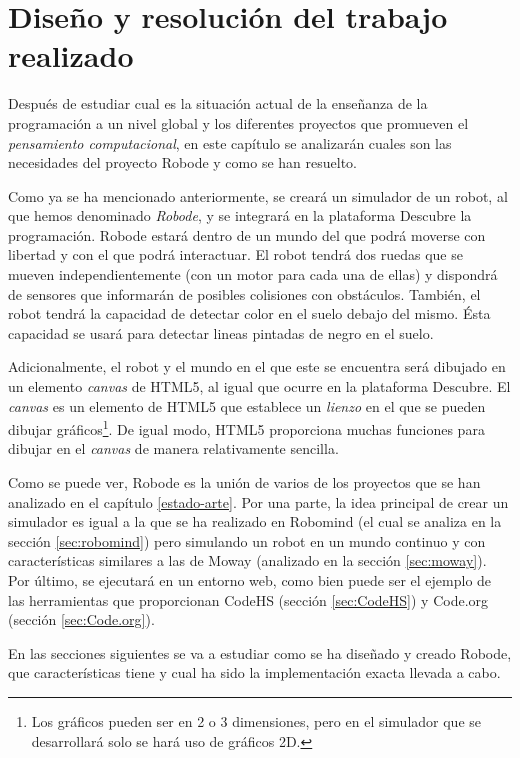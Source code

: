 \chapter{Diseño y resolución del trabajo realizado}
\label{diseno}

Después de estudiar cual es la situación actual de la enseñanza de la programación a un nivel global y los diferentes proyectos que promueven el \emph{pensamiento computacional}, en este capítulo se analizarán cuales son las necesidades del proyecto Robode y como se han resuelto.

Como ya se ha mencionado anteriormente, se creará un simulador de un robot, al que hemos denominado \emph{Robode}, y se integrará en la plataforma Descubre la programación. Robode  estará dentro de un mundo del que podrá moverse con libertad y con el que podrá interactuar. El robot tendrá dos ruedas que se mueven independientemente (con un motor para cada una de ellas) y dispondrá de sensores que informarán de posibles colisiones con obstáculos. También, el robot tendrá la capacidad de detectar color en el suelo debajo del mismo. Ésta capacidad se usará para detectar lineas pintadas de negro en el suelo.

Adicionalmente, el robot y el mundo en el que este se encuentra será dibujado en un elemento \emph{canvas} de HTML5, al igual que ocurre en la plataforma Descubre. El \emph{canvas} es un elemento de HTML5 que establece un \emph{lienzo} en el que se pueden dibujar gráficos\footnote{Los gráficos pueden ser en 2 o 3 dimensiones, pero en el simulador que se desarrollará solo se hará uso de gráficos 2D.}. De igual modo, HTML5 proporciona muchas funciones para dibujar en el \emph{canvas} de manera relativamente sencilla.


Como se puede ver, Robode es la unión de varios de los proyectos que se han analizado en el capítulo \ref{estado-arte}. Por una parte, la idea principal de crear un simulador es igual a la que se ha realizado en Robomind (el cual se analiza en la sección \ref{sec:robomind}) pero simulando un robot en un mundo continuo y con características similares a las de Moway (analizado en la sección \ref{sec:moway}). Por último, se ejecutará en un entorno web, como bien puede ser el ejemplo de las herramientas que proporcionan CodeHS (sección \ref{sec:CodeHS}) y Code.org (sección \ref{sec:Code.org}). 


En las secciones siguientes se va a estudiar como se ha diseñado y creado Robode, que características tiene y cual ha sido la implementación exacta llevada a cabo.





